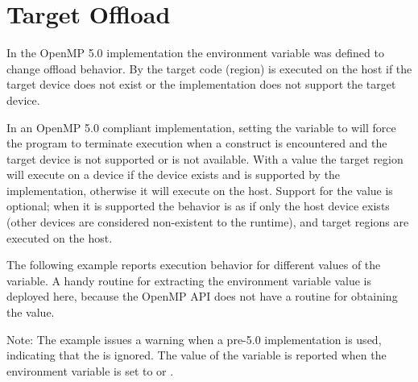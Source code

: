 \pagebreak
\section{Target Offload}
\label{sec:target_offload}

In the OpenMP 5.0 implementation the 
environment variable was defined to change  offload behavior. 
By  the target code (region) is executed on the host if the target device 
does not exist or the implementation does not support the target device.  

In an OpenMP 5.0 compliant implementation, setting the 
 variable to  will 
force the program to terminate execution when a  
construct is encountered and the target device is not supported or is not available.
With a value  the target region will execute on a device if the 
device exists and is supported by the implementation,
otherwise it will execute on the host.
Support for the 
value is optional; when it is supported the behavior is as if only the 
host device exists (other devices are considered non-existent to the runtime), 
and target regions are executed on the host.  

The following example reports execution behavior for different 
values of the  variable. A handy routine 
for extracting the  environment variable
value is deployed here, because the OpenMP API does not have a routine 
for obtaining the value. %

Note: 
The example issues a warning when a pre-5.0 implementation is used,
indicating that the  is ignored.
The value of the  variable is reported 
when the  
environment variable is set to  or .

{}

{}


